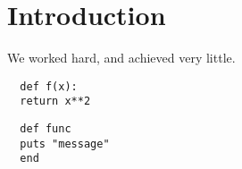 \documentclass{labTask}
\begin{document}
\section{Introduction}

We worked hard, and achieved very little.
\begin{verbatim}
  def f(x):
  return x**2
\end{verbatim}
\begin{verbatim}
  def func
  puts "message"
  end
\end{verbatim}
\end{document}
